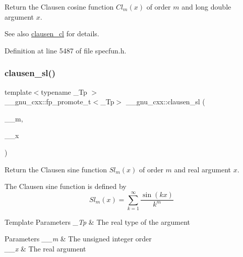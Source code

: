 Return the Clausen cosine function $ Cl_m(x) $ of order $ m $ and {\ttfamily long double} argument $ x $.

\begin{DoxySeeAlso}{See also}
\hyperlink{group__gnu__math__spec__func_ga8786b86db309998f93f877cfb9bdfd57}{clausen\+\_\+cl} for details. 
\end{DoxySeeAlso}


Definition at line 5487 of file specfun.\+h.

\mbox{\label{group__gnu__math__spec__func_gacb757b00309213cd96bb2bc6b5dc3c24}} 
\subsubsection{\texorpdfstring{clausen\+\_\+sl()}{clausen\_sl()}}
{\footnotesize\ttfamily template$<$typename \+\_\+\+Tp $>$ \\
\+\_\+\+\_\+gnu\+\_\+cxx\+::fp\+\_\+promote\+\_\+t$<$\+\_\+\+Tp$>$ \+\_\+\+\_\+gnu\+\_\+cxx\+::clausen\+\_\+sl (\begin{DoxyParamCaption}\item[{unsigned int}]{\+\_\+\+\_\+m,  }\item[{\+\_\+\+Tp}]{\+\_\+\+\_\+x }\end{DoxyParamCaption})\hspace{0.3cm}{\ttfamily [inline]}}

Return the Clausen sine function $ Sl_m(x) $ of order $ m $ and real argument $ x $.

The Clausen sine function is defined by \[ Sl_m(x) = \sum_{k=1}^\infty\frac{\sin(kx)}{k^m} \]


\begin{DoxyTemplParams}{Template Parameters}
{\em \+\_\+\+Tp} & The real type of the argument \\
\hline
\end{DoxyTemplParams}

\begin{DoxyParams}{Parameters}
{\em \+\_\+\+\_\+m} & The unsigned integer order \\
\hline
{\em \+\_\+\+\_\+x} & The real argument \\
\hline
\end{DoxyParams}


